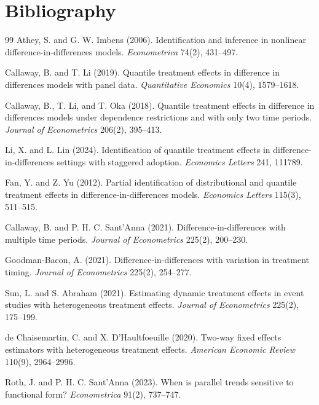 \documentclass[11pt]{article}
\theoremstyle{definition}
\theoremstyle{plain}
\theoremstyle{remark}
\begin{document}
\section*{Bibliography}
\begin{thebibliography}{99}
Athey, S. and G. W. Imbens (2006).
Identification and inference in nonlinear difference-in-differences models.
\emph{Econometrica} 74(2), 431--497.

Callaway, B. and T. Li (2019).
Quantile treatment effects in difference in differences models with panel data.
\emph{Quantitative Economics} 10(4), 1579--1618.

Callaway, B., T. Li, and T. Oka (2018).
Quantile treatment effects in difference in differences models under dependence restrictions and with only two time periods.
\emph{Journal of Econometrics} 206(2), 395--413.

Li, X. and L. Lin (2024).
Identification of quantile treatment effects in difference-in-differences settings with staggered adoption.
\emph{Economics Letters} 241, 111789.

Fan, Y. and Z. Yu (2012).
Partial identification of distributional and quantile treatment effects in difference-in-differences models.
\emph{Economics Letters} 115(3), 511--515.

Callaway, B. and P. H. C. Sant'Anna (2021).
Difference-in-differences with multiple time periods.
\emph{Journal of Econometrics} 225(2), 200--230.

Goodman-Bacon, A. (2021).
Difference-in-differences with variation in treatment timing.
\emph{Journal of Econometrics} 225(2), 254--277.

Sun, L. and S. Abraham (2021).
Estimating dynamic treatment effects in event studies with heterogeneous treatment effects.
\emph{Journal of Econometrics} 225(2), 175--199.

de Chaisemartin, C. and X. D'Haultfoeuille (2020).
Two-way fixed effects estimators with heterogeneous treatment effects.
\emph{American Economic Review} 110(9), 2964--2996.

Roth, J. and P. H. C. Sant'Anna (2023).
When is parallel trends sensitive to functional form?
\emph{Econometrica} 91(2), 737--747.
\end{thebibliography}
\end{document}
